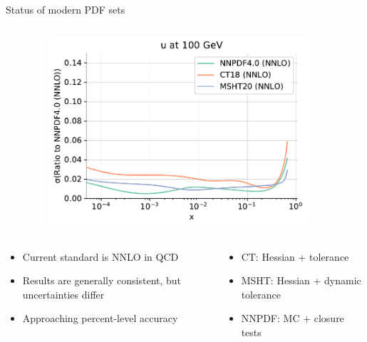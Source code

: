 \documentclass[aspectratio=169, 8pt,t]{beamer}
\begin{document}
\begin{frame}{Status of modern PDF sets}
\begin{columns}
\begin{column}{0.33\textwidth}
    \end{column}
    \begin{column}{0.33\textwidth}
      \begin{figure}
        \includegraphics[width=0.9\textwidth]{figures/pdfs_40vsothers_second_plot_pdf_uncertainties_u.pdf}
      \end{figure}
    \end{column}
  \end{columns}
  \begin{columns}
    \begin{column}{0.49\textwidth}
      \begin{itemize}
        \item Current standard is NNLO in QCD
        \item Results are generally consistent, but uncertainties differ
        \item Approaching percent-level accuracy
      \end{itemize}
    \end{column}
    \begin{column}{0.49\textwidth}
      \begin{itemize}
        \item CT: Hessian + tolerance
        \item MSHT: Hessian + dynamic tolerance
        \item NNPDF: MC + closure tests
      \end{itemize}
    \end{column}
  \end{columns}
\end{frame}
\end{document}
